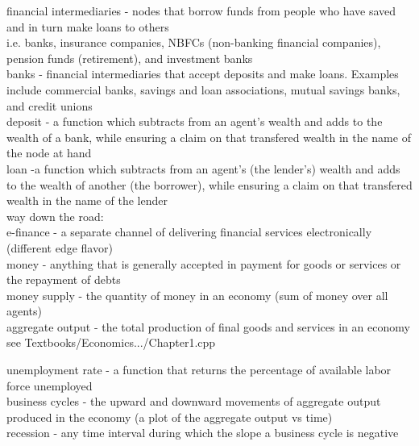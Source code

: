 \documentclass[12pt]{article}
\begin{document}
\noindent financial intermediaries - nodes that borrow funds from people who have saved and in turn make loans to others\\
\noindent i.e. banks, insurance companies, NBFCs (non-banking financial companies), pension funds (retirement), and investment banks\\

\noindent banks - financial intermediaries that accept deposits and make loans. Examples include commercial banks, savings and loan associations, mutual savings banks, and credit unions\\

\noindent deposit - a function which subtracts from an agent's wealth and adds to the wealth of a bank, while ensuring a claim on that transfered wealth in the name of the node at hand \\

\noindent loan -a function which subtracts from an agent's (the lender's) wealth and adds to the wealth of another (the borrower), while ensuring a claim on that transfered wealth in the name of the lender\\

\noindent way down the road: \\
\noindent e-finance - a separate channel of delivering financial services electronically (different edge flavor)\\

\noindent money - anything that is generally accepted in payment for goods or services or the repayment of debts\\

\noindent money supply - the quantity of money in an economy (sum of money over all agents)\\

\noindent aggregate output - the total production of final goods and services in an economy\\
\noindent see Textbooks/Economics.../Chapter1.cpp

\noindent unemployment rate -  a function that returns the percentage of available labor force unemployed\\

\noindent business cycles - the upward and downward movements of aggregate output produced in the economy (a plot of the aggregate output vs time)\\

\noindent recession - any time interval during which the slope a business cycle is negative\\
\end{document}

